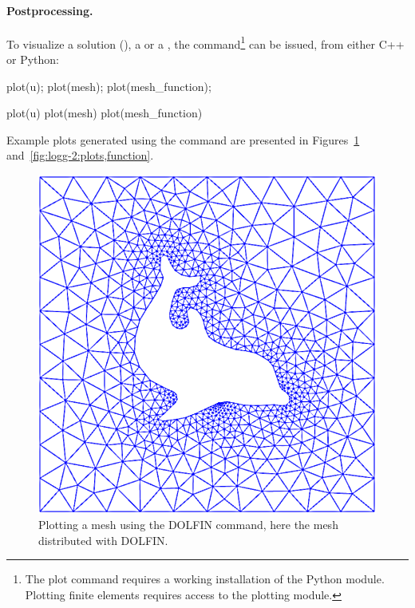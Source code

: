 \paragraph{Postprocessing.}

To visualize a solution (), a  or a
, the  command\footnote{The plot command
  requires a working installation of the  Python
  module. Plotting finite elements requires access to the 
  plotting module.} can be issued, from either C++ or Python:
\begin{c++}
plot(u);
plot(mesh);
plot(mesh_function);
\end{c++}
\begin{python}
plot(u)
plot(mesh)
plot(mesh_function)
\end{python}
Example plots generated using the  command are presented in
Figures~\ref{fig:logg-2:plots,mesh} and~\ref{fig:logg-2:plots,function}.

\begin{figure}
\bwfig
  \centering
  \includegraphics[width=\smallfig]{chapters/logg-2/png/plot_mesh.png}
  \caption{Plotting a mesh using the DOLFIN  command, here
    the mesh  distributed with DOLFIN.}
    \label{fig:logg-2:plots,mesh}
\end{figure}

